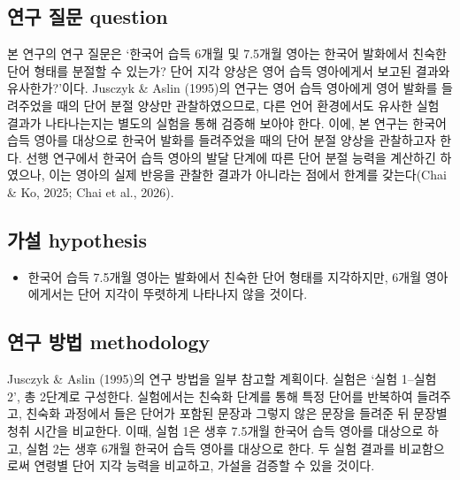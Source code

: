 \documentclass{article}
\newcommand{\englabel}[1]{{\normalfont\englabelfont\small #1}}
\begin{document}
\smallskip
\subsection{연구 질문 \englabel{question}}
본 연구의 연구 질문은 `한국어 습득 6개월 및 7.5개월 영아는 한국어 발화에서 친숙한 단어 형태를 분절할 수 있는가? 단어 지각 양상은 영어 습득 영아에게서 보고된 결과와 유사한가?'이다. Jusczyk \& Aslin (1995)의 연구는 영어 습득 영아에게 영어 발화를 들려주었을 때의 단어 분절 양상만 관찰하였으므로, 다른 언어 환경에서도 유사한 실험 결과가 나타나는지는 별도의 실험을 통해 검증해 보아야 한다. 이에, 본 연구는 한국어 습득 영아를 대상으로 한국어 발화를 들려주었을 때의 단어 분절 양상을 관찰하고자 한다. %
선행 연구에서 한국어 습득 영아의 발달 단계에 따른 단어 분절 능력을 계산하긴 하였으나, 이는 영아의 실제 반응을 관찰한 결과가 아니라는 점에서 한계를 갖는다(Chai \& Ko, 2025; Chai et al., 2026).   

\smallskip
\subsection{가설 \englabel{hypothesis}}
\begin{itemize}
  \item 한국어 습득 7.5개월 영아는 발화에서 친숙한 단어 형태를 지각하지만, 6개월 영아에게서는 단어 지각이 뚜렷하게 나타나지 않을 것이다. 
\end{itemize}

\smallskip
\subsection{연구 방법 \englabel{methodology}}
Jusczyk \& Aslin (1995)의 연구 방법을 일부 참고할 계획이다. 실험은 `실험 1--실험 2', 총 2단계로 구성한다. 실험에서는 친숙화 단계를 통해 특정 단어를 반복하여 들려주고, 친숙화 과정에서 들은 단어가 포함된 문장과 그렇지 않은 문장을 들려준 뒤 문장별 청취 시간을 비교한다. 이때, 실험 1은 생후 7.5개월 한국어 습득 영아를 대상으로 하고, 실험 2는 생후 6개월 한국어 습득 영아를 대상으로 한다. 두 실험 결과를 비교함으로써 연령별 단어 지각 능력을 비교하고, 가설을 검증할 수 있을 것이다. 
\end{document}

